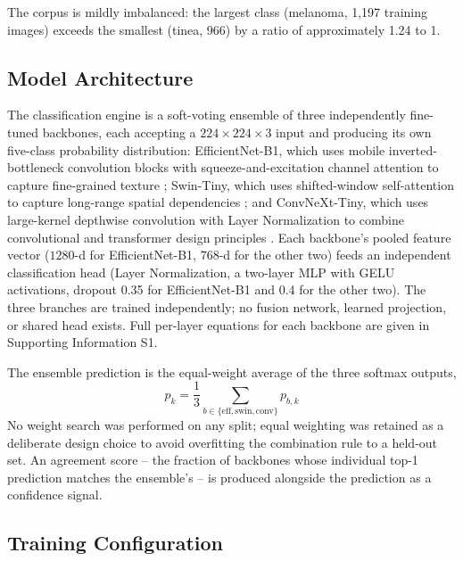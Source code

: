 \documentclass[VANCOUVER,twocolumn]{USG}
\begin{document}
The corpus is mildly imbalanced: the largest class (melanoma, 1,197
training images) exceeds the smallest (tinea, 966) by a ratio of
approximately 1.24 to 1.

\subsection{Model Architecture}

The classification engine is a soft-voting ensemble of three independently
fine-tuned backbones, each accepting a $224\times224\times3$ input and
producing its own five-class probability distribution: EfficientNet-B1,
which uses mobile inverted-bottleneck convolution blocks with
squeeze-and-excitation channel attention to capture fine-grained texture
\cite{ref27}; Swin-Tiny, which uses shifted-window self-attention to
capture long-range spatial dependencies \cite{ref11}; and ConvNeXt-Tiny,
which uses large-kernel depthwise convolution with Layer Normalization to
combine convolutional and transformer design principles \cite{ref12}. Each
backbone's pooled feature vector ($1280$-d for EfficientNet-B1, $768$-d for
the other two) feeds an independent classification head (Layer
Normalization, a two-layer MLP with GELU activations, dropout 0.35 for
EfficientNet-B1 and 0.4 for the other two). The three branches are trained
independently; no fusion network, learned projection, or shared head
exists. Full per-layer equations for each backbone are given in Supporting
Information S1.

The ensemble prediction is the equal-weight average of the three softmax
outputs,
\begin{equation}
p_k = \frac{1}{3}\sum_{b \in \{\mathrm{eff,swin,conv}\}} p_{b,k}
\end{equation}
No weight search was performed on any split; equal weighting was retained
as a deliberate design choice to avoid overfitting the combination rule to
a held-out set. An agreement score -- the fraction of backbones whose
individual top-1 prediction matches the ensemble's -- is produced alongside
the prediction as a confidence signal.

\subsection{Training Configuration}
\end{document}
